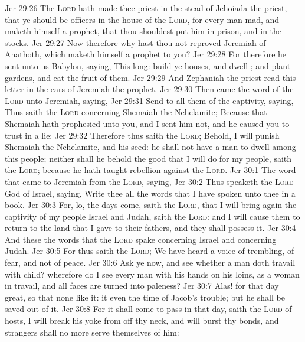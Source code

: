 \vs Jer 29:26 The \textsc{Lord} hath made thee priest in the stead of Jehoiada the priest, that ye should be officers in the house of the \textsc{Lord}, for every man  mad, and maketh himself a prophet, that thou shouldest put him in prison, and in the stocks.
\vs Jer 29:27 Now therefore why hast thou not reproved Jeremiah of Anathoth, which maketh himself a prophet to you?
\vs Jer 29:28 For therefore he sent unto us  Babylon, saying, This  long: build ye houses, and dwell ; and plant gardens, and eat the fruit of them.
\vs Jer 29:29 And Zephaniah the priest read this letter in the ears of Jeremiah the prophet.
\vs Jer 29:30 Then came the word of the \textsc{Lord} unto Jeremiah, saying,
\vs Jer 29:31 Send to all them of the captivity, saying, Thus saith the \textsc{Lord} concerning Shemaiah the Nehelamite; Because that Shemaiah hath prophesied unto you, and I sent him not, and he caused you to trust in a lie:
\vs Jer 29:32 Therefore thus saith the \textsc{Lord}; Behold, I will punish Shemaiah the Nehelamite, and his seed: he shall not have a man to dwell among this people; neither shall he behold the good that I will do for my people, saith the \textsc{Lord}; because he hath taught rebellion against the \textsc{Lord}.
\vs Jer 30:1 The word that came to Jeremiah from the \textsc{Lord}, saying,
\vs Jer 30:2 Thus speaketh the \textsc{Lord} God of Israel, saying, Write thee all the words that I have spoken unto thee in a book.
\vs Jer 30:3 For, lo, the days come, saith the \textsc{Lord}, that I will bring again the captivity of my people Israel and Judah, saith the \textsc{Lord}: and I will cause them to return to the land that I gave to their fathers, and they shall possess it.
\vs Jer 30:4 And these  the words that the \textsc{Lord} spake concerning Israel and concerning Judah.
\vs Jer 30:5 For thus saith the \textsc{Lord}; We have heard a voice of trembling, of fear, and not of peace.
\vs Jer 30:6 Ask ye now, and see whether a man doth travail with child? wherefore do I see every man with his hands on his loins, as a woman in travail, and all faces are turned into paleness?
\vs Jer 30:7 Alas! for that day  great, so that none  like it: it  even the time of Jacob's trouble; but he shall be saved out of it.
\vs Jer 30:8 For it shall come to pass in that day, saith the \textsc{Lord} of hosts,  I will break his yoke from off thy neck, and will burst thy bonds, and strangers shall no more serve themselves of him:
